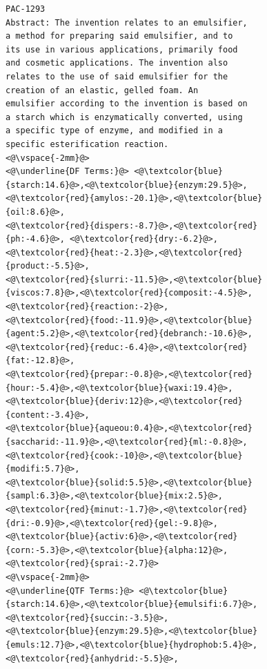 \begin{figure}[t!]
\begin{framed}
\vspace*{-2ex}
  \centering
 \begin{lstlisting}[basicstyle=\scriptsize\ttfamily , linewidth=\columnwidth,breaklines=true] 
PAC-1293
Abstract: The invention relates to an emulsifier, 
a method for preparing said emulsifier, and to 
its use in various applications, primarily food 
and cosmetic applications. The invention also 
relates to the use of said emulsifier for the 
creation of an elastic, gelled foam. An 
emulsifier according to the invention is based on 
a starch which is enzymatically converted, using 
a specific type of enzyme, and modified in a 
specific esterification reaction.
<@\vspace{-2mm}@>
<@\underline{DF Terms:}@> <@\textcolor{blue}{starch:14.6}@>,<@\textcolor{blue}{enzym:29.5}@>,<@\textcolor{red}{amylos:-20.1}@>,<@\textcolor{blue}{oil:8.6}@>,
<@\textcolor{red}{dispers:-8.7}@>,<@\textcolor{red}{ph:-4.6}@>, <@\textcolor{red}{dry:-6.2}@>,<@\textcolor{red}{heat:-2.3}@>,<@\textcolor{red}{product:-5.5}@>,
<@\textcolor{red}{slurri:-11.5}@>,<@\textcolor{blue}{viscos:7.8}@>,<@\textcolor{red}{composit:-4.5}@>,<@\textcolor{red}{reaction:-2}@>,
<@\textcolor{red}{food:-11.9}@>,<@\textcolor{blue}{agent:5.2}@>,<@\textcolor{red}{debranch:-10.6}@>,<@\textcolor{red}{reduc:-6.4}@>,<@\textcolor{red}{fat:-12.8}@>,
<@\textcolor{red}{prepar:-0.8}@>,<@\textcolor{red}{hour:-5.4}@>,<@\textcolor{blue}{waxi:19.4}@>,<@\textcolor{blue}{deriv:12}@>,<@\textcolor{red}{content:-3.4}@>,
<@\textcolor{blue}{aqueou:0.4}@>,<@\textcolor{red}{saccharid:-11.9}@>,<@\textcolor{red}{ml:-0.8}@>,<@\textcolor{red}{cook:-10}@>,<@\textcolor{blue}{modifi:5.7}@>,
<@\textcolor{blue}{solid:5.5}@>,<@\textcolor{blue}{sampl:6.3}@>,<@\textcolor{blue}{mix:2.5}@>,<@\textcolor{red}{minut:-1.7}@>,<@\textcolor{red}{dri:-0.9}@>,<@\textcolor{red}{gel:-9.8}@>,
<@\textcolor{blue}{activ:6}@>,<@\textcolor{red}{corn:-5.3}@>,<@\textcolor{blue}{alpha:12}@>,<@\textcolor{red}{sprai:-2.7}@> 
<@\vspace{-2mm}@>
<@\underline{QTF Terms:}@> <@\textcolor{blue}{starch:14.6}@>,<@\textcolor{blue}{emulsifi:6.7}@>,<@\textcolor{red}{succin:-3.5}@>,
<@\textcolor{blue}{enzym:29.5}@>,<@\textcolor{blue}{emuls:12.7}@>,<@\textcolor{blue}{hydrophob:5.4}@>,<@\textcolor{red}{anhydrid:-5.5}@>,

\end{lstlisting}
\end{framed}
\end{figure}
